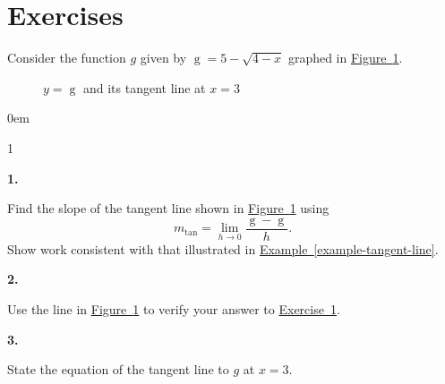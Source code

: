 \documentclass[12pt,]{book}
\theoremstyle{plain}
\theoremstyle{definition}
\numberwithin{equation}{section}
\newenvironment{exercisegroup}%
{\medskip\noindent}%
{\par\bigskip}%
\newlength{\exercisegroupindent}%
\newlength{\exercisegroupitemwidth}%
\newenvironment{exercisegrouplist}%
{\vspace{-\partopsep}%
\begin{adjustwidth}{\exercisegroupindent}{0em}}%
{\end{adjustwidth}%
\vspace{-\partopsep}%
\vspace{\baselineskip}}%
\newenvironment{exercisegroupbycol}[1]%
{\begin{exercisegrouplist}%
\vspace{-\multicolsep}%
\begin{multicols}{#1}%
\setlength{\parindent}{0em}%
\setlength{\exercisegroupitemwidth}{\linewidth}}%
{\end{multicols}%
\vspace{-\multicolsep}%
\end{exercisegrouplist}}%
\newenvironment{exercisegroupitem}[1]%
{\begin{minipage}[t]{\exercisegroupitemwidth}
\vspace{0pt}%
{\bfseries#1}%
\rule{0pt}{\baselineskip}}{\strut%
\end{minipage}%
\hspace{\columnsep}}%
\providecommand\phantomsection{}
\newcommand{\fe}[2]{\mathop{{#1}{\left(#2\right)}}}
\begin{document}
\section*{Exercises}\label{exercises-20}

\begin{exercisegroup}%
Consider the function \(g\) given by \(\fe{g}{x}=5-\sqrt{4-x}\) graphed in \hyperref[figure-tangent-line-exercise]{Figure~\ref*{figure-tangent-line-exercise}}.%
\begin{figure}
\centering
{
}
\caption{\(y=\fe{g}{x}\) and its tangent line at \(x=3\)\label{figure-tangent-line-exercise}}
\end{figure}
\par
\begin{exercisegroupbycol}{1}%
\begin{exercisegroupitem}{1. }\phantomsection\hypertarget{exercise-tangent-line}{\null}
 Find the slope of the tangent line shown in \hyperref[figure-tangent-line-exercise]{Figure~\ref*{figure-tangent-line-exercise}} using \[m_{\text{tan}}=\lim_{h\to0}\frac{\fe{g}{3+h}-\fe{g}{3}}{h}\text{.}\] Show work consistent with that illustrated in \hyperref[example-tangent-line]{Example~\ref*{example-tangent-line}}.%
\end{exercisegroupitem}%
\par%
\begin{exercisegroupitem}{2. }\phantomsection\hypertarget{exercise-183}{\null}
Use the line in \hyperref[figure-tangent-line-exercise]{Figure~\ref*{figure-tangent-line-exercise}} to verify your answer to \hyperref[exercise-tangent-line]{Exercise~1}.%
\end{exercisegroupitem}%
\par%
\begin{exercisegroupitem}{3. }\phantomsection\hypertarget{exercise-184}{\null}
State the equation of the tangent line to \(g\) at \(x=3\).%
\end{exercisegroupitem}%
\par%
\end{exercisegroupbycol}%
\end{exercisegroup}%
\typeout{************************************************}
\typeout{************************************************}
\end{document}
